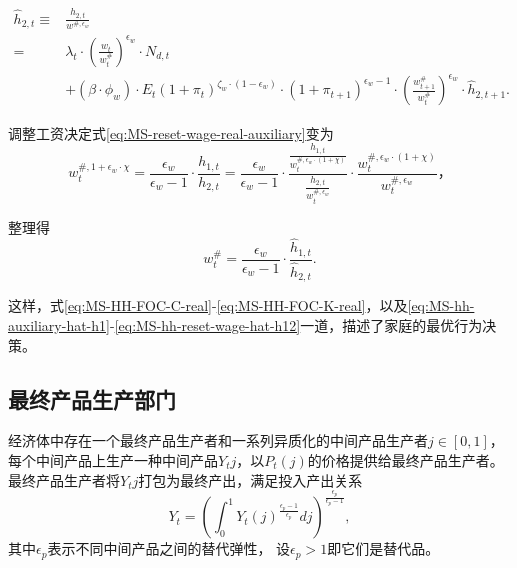 \begin{equation}
\label{eq:MS-hh-auxiliary-hat-h2}
\begin{split}
\hat{h}_{2,t} \equiv & \frac{h_{2,t}}{w^{\#, \epsilon_w}} \\
= & \lambda_t \cdot \left(\frac{w_t}{w_t^{\#}}\right)^{\epsilon_w} \cdot N_{d,t} \\
&+ \left(\beta \cdot \phi_w \right) \cdot E_t \left( 1+\pi_t \right)^{\zeta_w \cdot (1-\epsilon_w)} \cdot \left(1 + \pi_{t+1} \right)^{\epsilon_w -1} \cdot \left(\frac{w^{\#}_{t+1}}{w^{\#}_{t}}\right)^{\epsilon_w} \cdot \hat{h}_{2,t+1}.
\end{split}
\end{equation}

调整工资决定式\eqref{eq:MS-reset-wage-real-auxiliary}变为
\begin{equation*}
w_t^{\#, 1+\epsilon_w \cdot \chi} = \frac{\epsilon_w}{\epsilon_w -1} \cdot \frac{h_{1,t}}{h_{2,t}} = \frac{\epsilon_w}{\epsilon_w -1} \cdot \frac{
  \frac{h_{1,t}}{w_{t}^{\#, \epsilon_w \cdot \left(1+\chi\right)}}
}{
  \frac{h_{2,t}}{w_{t}^{\#, \epsilon_w}}
} \cdot \frac{
  w_{t}^{\#, \epsilon_w \cdot \left(1+\chi\right)}
  }{
  w_{t}^{\#, \epsilon_w}
  }，
\end{equation*}

整理得
\begin{equation}
\label{eq:MS-hh-reset-wage-hat-h12}
w^{\#}_t = \frac{\epsilon_w}{\epsilon_w -1} \cdot \frac{
  \hat{h}_{1,t}
}{
  \hat{h}_{2,t}
}.
\end{equation}

这样，式\eqref{eq:MS-HH-FOC-C-real}-\eqref{eq:MS-HH-FOC-K-real}，以及\eqref{eq:MS-hh-auxiliary-hat-h1}-\eqref{eq:MS-hh-reset-wage-hat-h12}一道，描述了家庭的最优行为决策。

\subsection{最终产品生产部门}
经济体中存在一个最终产品生产者和一系列异质化的中间产品生产者$j \in [0,1]$，每个中间产品上生产一种中间产品$Y_t{j}$，以$P_t(j)$的价格提供给最终产品生产者。最终产品生产者将$Y_t{j}$打包为最终产出，满足投入产出关系
\begin{equation}
\label{MS-fp-output-rela}
Y_t = \left(\int_{0}^{1} Y_t(j)^{\frac{\epsilon_p -1}{\epsilon_p}} dj\right)^{\frac{\epsilon_p}{\epsilon_p -1}},
\end{equation}
其中$\epsilon_p$表示不同中间产品之间的替代弹性， 设$\epsilon_p > 1$即它们是替代品。

